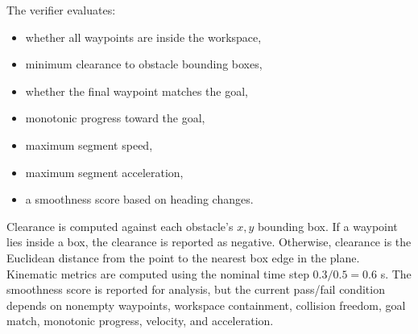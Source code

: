 \documentclass[11pt]{article}
\begin{document}
The verifier evaluates:

\begin{itemize}
  \item whether all waypoints are inside the workspace,
  \item minimum clearance to obstacle bounding boxes,
  \item whether the final waypoint matches the goal,
  \item monotonic progress toward the goal,
  \item maximum segment speed,
  \item maximum segment acceleration,
  \item a smoothness score based on heading changes.
\end{itemize}

Clearance is computed against each obstacle's \(x,y\) bounding box. If a waypoint lies inside a box, the clearance is reported as negative. Otherwise, clearance is the Euclidean distance from the point to the nearest box edge in the plane. Kinematic metrics are computed using the nominal time step \(0.3/0.5 = 0.6\) s. The smoothness score is reported for analysis, but the current pass/fail condition depends on nonempty waypoints, workspace containment, collision freedom, goal match, monotonic progress, velocity, and acceleration.

\begin{table}[H]
\centering
\caption{Verification result table for report completion. Replace with measured logs when final experiments are available.}
\label{tab:verification-results}
\end{table}
\end{document}
